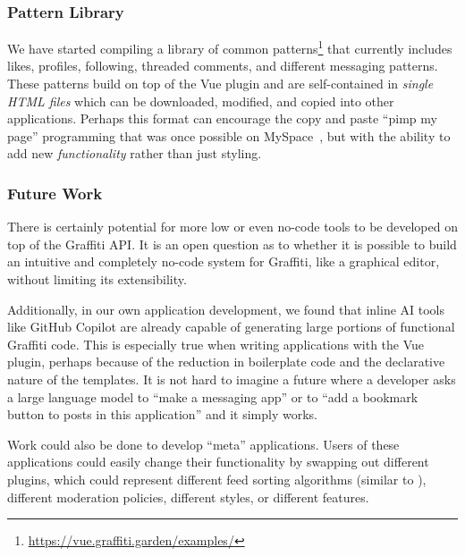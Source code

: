 \subsubsection{Pattern Library}

We have started compiling a library of common patterns\footnote{
    \url{https://vue.graffiti.garden/examples/}
} that currently includes likes, profiles, following, threaded comments,
and different messaging patterns.
These patterns build on top of the Vue plugin
and are self-contained in \emph{single HTML files}
which can be downloaded, modified, and copied into other
applications.
Perhaps this format can encourage the copy and paste ``pimp my page''
programming that was once possible on MySpace~\cite{copypasteliteracy},
but with the ability to add new \emph{functionality} rather than just styling.

\subsubsection{Future Work}
\label{above-and-below:above:future-work}

There is certainly potential for more low or even no-code tools
to be developed on top of the Graffiti API. It is an open
question as to whether it is possible to build an intuitive and completely
no-code system for Graffiti, like a graphical editor, without limiting
its extensibility.

Additionally, in our own application development,
we found that inline AI tools like GitHub Copilot are already
capable of generating large portions of functional Graffiti code.
This is especially true when writing applications with the
Vue plugin, perhaps because of the reduction in boilerplate
code and the declarative nature of the templates.
It is not hard to imagine a future where a developer asks
a large language model to ``make a messaging app''
or to ``add a bookmark button to posts in this application'' and
it simply works.

Work could also be done to develop ``meta'' applications.
Users of these applications could easily change their functionality
by swapping out different plugins,
which could represent different feed sorting algorithms
(similar to \cite{threeleggedstool, bluesky}),
different moderation policies, different styles,
or different features.

